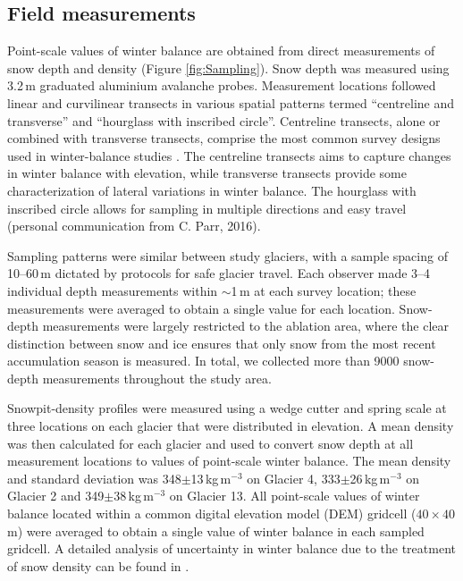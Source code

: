 \documentclass[twocolumn,letterpaper]{igs}
\begin{document}
\subsection{Field measurements}

Point-scale values of winter balance are obtained from direct measurements of snow depth and density (Figure \ref{fig:Sampling}). Snow depth was measured using  3.2\,m graduated aluminium avalanche probes. Measurement locations followed linear and curvilinear transects in various spatial patterns termed ``centreline and transverse'' and ``hourglass with inscribed circle''. 
Centreline transects, alone or combined with transverse transects, comprise the most common survey designs used in winter-balance studies \citep[e.g.][]{Kaser2002, Machguth2006}. The centreline transects aims to capture changes in winter balance with elevation, while transverse transects provide some characterization of lateral variations in winter balance. The hourglass with inscribed circle allows for sampling in multiple directions and easy travel (personal communication from C. Parr, 2016). 

Sampling patterns were similar between study glaciers, with a sample spacing of 10--60\,m dictated by protocols for safe glacier travel. Each observer made 3--4 individual depth measurements within $\sim$1\,m at each survey location; these measurements were averaged to obtain a single value for each location. Snow-depth measurements were largely restricted to the ablation area, where the clear distinction between snow and ice ensures that only snow from the most recent accumulation season is measured. In total, we collected more than 9000 snow-depth measurements throughout the study area. 

Snowpit-density profiles were measured using a wedge cutter and spring scale at three locations on each glacier that were distributed in elevation. A mean density was then calculated for each glacier and used to convert snow depth at all measurement locations to values of point-scale winter balance. The mean density and standard deviation was 348$\pm$13\,kg\,m$^{-3}$ on Glacier 4, 333$\pm$26\,kg\,m$^{-3}$ on Glacier 2 and 349$\pm$38\,kg\,m$^{-3}$ on Glacier 13. All point-scale values of winter balance located within a common digital elevation model (DEM) gridcell ($40\times40$\,m) were averaged to obtain a single value of winter balance in each sampled gridcell. A detailed analysis of uncertainty in winter balance due to the treatment of snow density can be found in \cite{Pulwicki2017}. 
\end{document}
